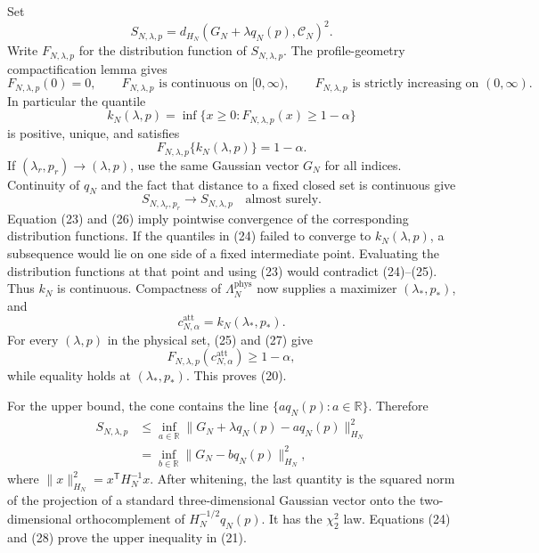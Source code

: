 Set
\[
S_{N,\lambda,p}=d_{H_N}(G_N+\lambda q_N(p),\mathcal C_N)^2.
\]
Write \(F_{N,\lambda,p}\) for the distribution function of \(S_{N,\lambda,p}\).  The profile-geometry compactification lemma gives
\[
F_{N,\lambda,p}(0)=0,
\qquad F_{N,\lambda,p}\text{ is continuous on }[0,\infty),
\qquad F_{N,\lambda,p}\text{ is strictly increasing on }(0,\infty).         \tag{23}
\]
In particular the quantile
\[
k_N(\lambda,p)=\inf\{x\ge0:F_{N,\lambda,p}(x)\ge1-\alpha\}                 \tag{24}
\]
is positive, unique, and satisfies
\[
F_{N,\lambda,p}\{k_N(\lambda,p)\}=1-\alpha.                                \tag{25}
\]
If \((\lambda_r,p_r)\to(\lambda,p)\), use the same Gaussian vector \(G_N\) for all indices.  Continuity of \(q_N\) and the fact that distance to a fixed closed set is continuous give
\[
S_{N,\lambda_r,p_r}\longrightarrow S_{N,\lambda,p}
\quad\text{almost surely}.                                                    \tag{26}
\]
Equation (23) and (26) imply pointwise convergence of the corresponding distribution functions.  If the quantiles in (24) failed to converge to \(k_N(\lambda,p)\), a subsequence would lie on one side of a fixed intermediate point.  Evaluating the distribution functions at that point and using (23) would contradict (24)--(25).  Thus \(k_N\) is continuous.  Compactness of \(\Lambda_N^{\mathrm{phys}}\) now supplies a maximizer \((\lambda_*,p_*)\), and
\[
c_{N,\alpha}^{\mathrm{att}}=k_N(\lambda_*,p_*).                              \tag{27}
\]
For every \((\lambda,p)\) in the physical set, (25) and (27) give
\[
F_{N,\lambda,p}(c_{N,\alpha}^{\mathrm{att}})\ge1-\alpha,
\]
while equality holds at \((\lambda_*,p_*)\).  This proves (20).

For the upper bound, the cone contains the line \(\{a q_N(p):a\in\mathbb R\}\).  Therefore
\[
\begin{aligned}
S_{N,\lambda,p}
&\le \inf_{a\in\mathbb R}
 \|G_N+\lambda q_N(p)-a q_N(p)\|_{H_N}^2\\
&=\inf_{b\in\mathbb R}\|G_N-bq_N(p)\|_{H_N}^2,                              \tag{28}
\end{aligned}
\]
where \(\|x\|_{H_N}^2=x^{\mathsf T}H_N^{-1}x\).  After whitening, the last quantity is the squared norm of the projection of a standard three-dimensional Gaussian vector onto the two-dimensional orthocomplement of \(H_N^{-1/2}q_N(p)\).  It has the \(\chi^2_2\) law.  Equations (24) and (28) prove the upper inequality in (21).

